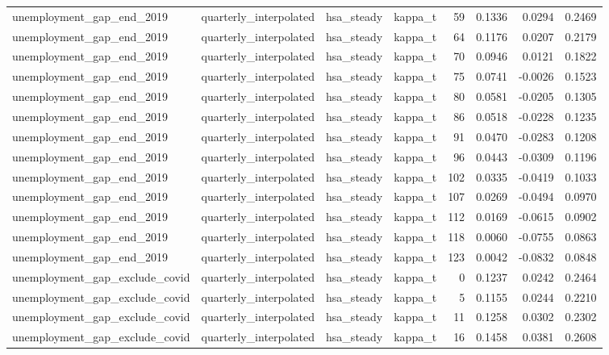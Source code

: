 \begin{tabular}{llllrrrr}
unemployment\_gap\_end\_2019 & quarterly\_interpolated & hsa\_steady & kappa\_t & 59 & 0.1336 & 0.0294 & 0.2469 \\
unemployment\_gap\_end\_2019 & quarterly\_interpolated & hsa\_steady & kappa\_t & 64 & 0.1176 & 0.0207 & 0.2179 \\
unemployment\_gap\_end\_2019 & quarterly\_interpolated & hsa\_steady & kappa\_t & 70 & 0.0946 & 0.0121 & 0.1822 \\
unemployment\_gap\_end\_2019 & quarterly\_interpolated & hsa\_steady & kappa\_t & 75 & 0.0741 & -0.0026 & 0.1523 \\
unemployment\_gap\_end\_2019 & quarterly\_interpolated & hsa\_steady & kappa\_t & 80 & 0.0581 & -0.0205 & 0.1305 \\
unemployment\_gap\_end\_2019 & quarterly\_interpolated & hsa\_steady & kappa\_t & 86 & 0.0518 & -0.0228 & 0.1235 \\
unemployment\_gap\_end\_2019 & quarterly\_interpolated & hsa\_steady & kappa\_t & 91 & 0.0470 & -0.0283 & 0.1208 \\
unemployment\_gap\_end\_2019 & quarterly\_interpolated & hsa\_steady & kappa\_t & 96 & 0.0443 & -0.0309 & 0.1196 \\
unemployment\_gap\_end\_2019 & quarterly\_interpolated & hsa\_steady & kappa\_t & 102 & 0.0335 & -0.0419 & 0.1033 \\
unemployment\_gap\_end\_2019 & quarterly\_interpolated & hsa\_steady & kappa\_t & 107 & 0.0269 & -0.0494 & 0.0970 \\
unemployment\_gap\_end\_2019 & quarterly\_interpolated & hsa\_steady & kappa\_t & 112 & 0.0169 & -0.0615 & 0.0902 \\
unemployment\_gap\_end\_2019 & quarterly\_interpolated & hsa\_steady & kappa\_t & 118 & 0.0060 & -0.0755 & 0.0863 \\
unemployment\_gap\_end\_2019 & quarterly\_interpolated & hsa\_steady & kappa\_t & 123 & 0.0042 & -0.0832 & 0.0848 \\
unemployment\_gap\_exclude\_covid & quarterly\_interpolated & hsa\_steady & kappa\_t & 0 & 0.1237 & 0.0242 & 0.2464 \\
unemployment\_gap\_exclude\_covid & quarterly\_interpolated & hsa\_steady & kappa\_t & 5 & 0.1155 & 0.0244 & 0.2210 \\
unemployment\_gap\_exclude\_covid & quarterly\_interpolated & hsa\_steady & kappa\_t & 11 & 0.1258 & 0.0302 & 0.2302 \\
unemployment\_gap\_exclude\_covid & quarterly\_interpolated & hsa\_steady & kappa\_t & 16 & 0.1458 & 0.0381 & 0.2608 \\

\end{tabular}
